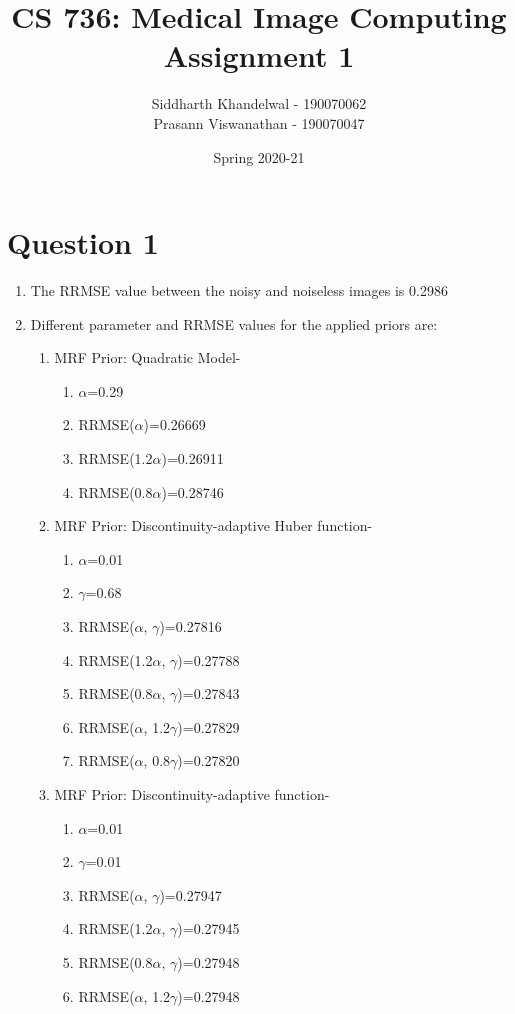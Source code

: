 \documentclass[12pt]{article}
\title{CS 736: Medical Image Computing\\\large{Assignment 1}}
\author{Siddharth Khandelwal - 190070062\\Prasann Viswanathan - 190070047}
\date{Spring 2020-21}
\theoremstyle{definition}
\numberwithin{thm}{section}
\begin{document}
\maketitle
\tableofcontents
\listoffigures
\newpage
\section{Question 1}
\begin{enumerate}[label=(\alph*)]
\item The RRMSE value between the noisy and noiseless images is 0.2986
\item Different parameter and RRMSE values for the applied priors are:
\begin{enumerate}[label=(\arabic*)]
\item MRF Prior: Quadratic Model-
	\begin{enumerate}
		\item $\alpha$=0.29 
		\item RRMSE($\alpha$)=0.26669
		\item RRMSE(1.2$\alpha$)=0.26911
		\item RRMSE(0.8$\alpha$)=0.28746
	\end{enumerate}
	\item MRF Prior: Discontinuity-adaptive Huber function-
	\begin{enumerate}
		\item $\alpha$=0.01
		\item $\gamma$=0.68 
		\item RRMSE($\alpha$, $\gamma$)=0.27816
		\item RRMSE(1.2$\alpha$, $\gamma$)=0.27788
		\item RRMSE(0.8$\alpha$, $\gamma$)=0.27843
		\item RRMSE($\alpha$, 1.2$\gamma$)=0.27829
		\item RRMSE($\alpha$, 0.8$\gamma$)=0.27820
	\end{enumerate}
	\item MRF Prior: Discontinuity-adaptive function-
	\begin{enumerate}
		\item $\alpha$=0.01 
		\item $\gamma$=0.01
		\item RRMSE($\alpha$, $\gamma$)=0.27947
		\item RRMSE(1.2$\alpha$, $\gamma$)=0.27945
		\item RRMSE(0.8$\alpha$, $\gamma$)=0.27948
		\item RRMSE($\alpha$, 1.2$\gamma$)=0.27948

\end{enumerate}
\end{enumerate}
\end{enumerate}
\end{document}
